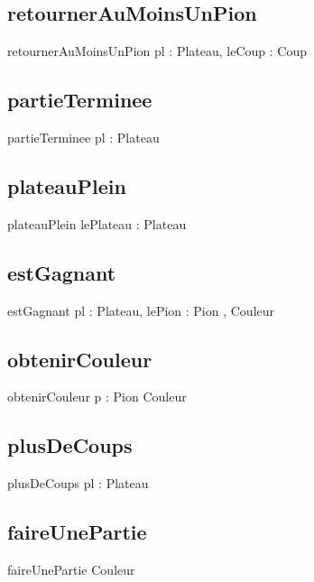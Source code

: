 	\subsection{retournerAuMoinsUnPion}
		\begin{algorithme}
			\signaturefonction
				{retournerAuMoinsUnPion}
				{pl : Plateau, leCoup : Coup}
				{\booleen}
		\end{algorithme}
	\subsection{partieTerminee}
		\begin{algorithme}
			\signaturefonction
				{partieTerminee}
				{pl : Plateau}
				{\booleen}
		\end{algorithme}
	\subsection{plateauPlein}
		\begin{algorithme}
			\signaturefonction
				{plateauPlein}
				{lePlateau : Plateau}
				{\booleen}
		\end{algorithme}
	\subsection{estGagnant}
		\begin{algorithme}
			\signaturefonction
				{estGagnant}
				{pl : Plateau, lePion : Pion}
				{\booleen, Couleur}
		\end{algorithme}
	\subsection{obtenirCouleur}
		\begin{algorithme}
			\signaturefonction
				{obtenirCouleur}
				{p : Pion}
				{Couleur}
		\end{algorithme}
	\subsection{plusDeCoups}
		\begin{algorithme}
			\signaturefonction
				{plusDeCoups}
				{pl : Plateau}
				{\booleen}
		\end{algorithme}
	\subsection{faireUnePartie}
\begin{algorithme}
	\signaturefonction
	{faireUnePartie}
	{}
	{Couleur}
\end{algorithme}

